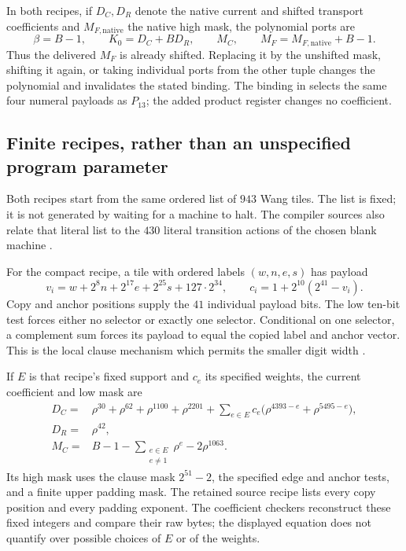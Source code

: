\documentclass[11pt,a4paper]{article}
\theoremstyle{definition}
\begin{document}
In both recipes, if \(D_C,D_R\) denote the native current and shifted
transport coefficients and \(M_{F,\mathrm{native}}\) the native high mask,
the polynomial ports are
\begin{equation}
 \beta=B-1,\qquad K_0=D_C+BD_R,\qquad
 M_C,\qquad M_F=M_{F,\mathrm{native}}+B-1.
 \label{eq:four-port-binding}
\end{equation}
Thus the delivered \(M_F\) is already shifted.  Replacing it by the
unshifted mask, shifting it again, or taking individual ports from the
other tuple changes the polynomial and invalidates the stated binding.
The binding in  selects the same
four numeral payloads as \(P_{13}\); the added product register changes
no coefficient.

\subsection{Finite recipes, rather than an unspecified program parameter}

Both recipes start from the same ordered list of \(943\) Wang tiles.
The list is fixed; it is not generated by waiting for a machine to halt.
The compiler sources also relate that literal list to the \(430\)
literal transition actions of the chosen blank machine
\cite{source34,source44,fixed-source}.

For the compact recipe, a tile with ordered labels \((w,n,e,s)\) has
payload
\[
 v_i=w+2^8n+2^{17}e+2^{25}s+127\cdot2^{34},
 \qquad c_i=1+2^{10}(2^{41}-v_i).
\]
Copy and anchor positions supply the \(41\) individual payload bits.
The low ten-bit test forces either no selector or exactly one selector.
Conditional on one selector, a complement sum forces its payload to
equal the copied label and anchor vector.  This is the local clause
mechanism which permits the smaller digit width \cite{source44}.

If \(E\) is that recipe's fixed support and \(c_e\) its specified weights,
the current coefficient and low mask are
\begin{align*}
 D_C={}&\rho^{30}+\rho^{62}+\rho^{1100}+\rho^{2201}
       +\sum_{e\in E}c_e
          \bigl(\rho^{4393-e}+\rho^{5495-e}\bigr),\\
 D_R={}&\rho^{42},\\
 M_C={}&B-1-\sum_{\substack{e\in E\\e\ne1}}\rho^e
                 -2\rho^{1063}.
\end{align*}
Its high mask uses the clause mask \(2^{51}-2\), the specified edge and
anchor tests, and a finite upper padding mask.  The retained source
recipe lists every copy position and every padding exponent.  The
coefficient checkers reconstruct these fixed integers and compare
their raw bytes; the displayed equation does not quantify over
possible choices of \(E\) or of the weights.
\end{document}
